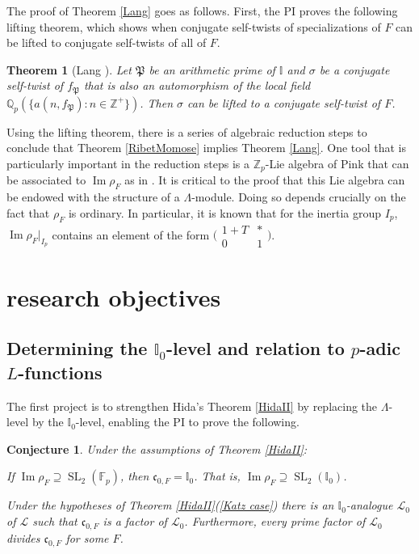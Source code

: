 \documentclass[11pt]{amsart}
\newtheorem{thm}{Theorem}[section]
\newtheorem{conj}{Conjecture}
\theoremstyle{definition}
\theoremstyle{remark}
\def\cc{\mathfrak{c}}
\def\F{\mathbb{F}}
\def\I{\mathbb{I}}
\def\aL{\mathcal{L}}
\def\Pp{\mathfrak{P}}
\def\Q{\mathbb{Q}}
\def\Z{\mathbb{Z}}
\DeclareMathOperator{\im}{Im}
\DeclareMathOperator{\SL}{SL}
\begin{document}
The proof of Theorem \ref{Lang} goes as follows.  First, the PI proves the following lifting theorem, which shows when conjugate self-twists of specializations of $F$ can be lifted to conjugate self-twists of all of $F$.  

\begin{thm}[Lang \cite{Lang15}]\label{lifting}
Let $\Pp$ be an arithmetic prime of $\I$ and $\sigma$ be a conjugate self-twist of $f_\Pp$ that is also an automorphism of the local field $\Q_p(\{a(n, f_\Pp) : n \in \Z^+\})$.  Then $\sigma$ can be lifted to a conjugate self-twist of $F$.
\end{thm}

Using the lifting theorem, there is a series of algebraic reduction steps to conclude that Theorem \ref{RibetMomose} implies Theorem \ref{Lang}.  One tool that is particularly important in the reduction steps is a $\Z_p$-Lie algebra of Pink \cite{Pink93} that can be associated to $\im \rho_F$ as in \cite{Hida15}.  It is critical to the proof that this Lie algebra can be endowed with the structure of a $\Lambda$-module.  Doing so depends crucially on the fact that $\rho_F$ is ordinary.  In particular, it is known \cite[Theorem 4.3.2]{HidaGME} that for the inertia group $I_p$, $\im \rho_F|_{I_p}$ contains an element of the form
$\bigl(
\begin{smallmatrix}
1 + T & *\\
0 & 1
\end{smallmatrix}
\bigr)$. 

\section*{research objectives}\label{future}
\subsection*{Determining the $\I_0$-level and relation to $p$-adic $L$-functions}
The first project is to strengthen Hida's Theorem \ref{HidaII} by replacing the $\Lambda$-level by the $\I_0$-level, enabling the PI to prove the following.

\begin{conj}\label{level}
Under the assumptions of Theorem \ref{HidaII}:
\begin{enumerate*}
\item\label{full} If $\im \rho_F \supseteq \SL_2(\F_p)$, then $\cc_{0,F} = \I_0$.  That is, $\im \rho_F \supseteq \SL_2(\I_0)$.
\item\label{Katz} Under the hypotheses of Theorem \ref{HidaII}(\ref{Katz case}) there is an $\I_0$-analogue $\aL_0$ of $\aL$ such that $\cc_{0,F}$ is a factor of $\aL_0$.  Furthermore, every prime factor of $\aL_0$ divides $\cc_{0, F}$ for some $F$. 
\end{enumerate*}
\end{conj}
\end{document}
